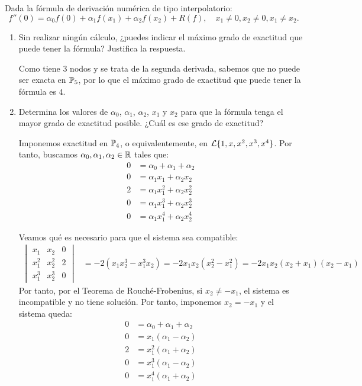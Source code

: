 \begin{ejercicio}[DGIIM 2023/2024]\label{ej:2.2.5}
    Dada la fórmula de derivación numérica de tipo interpolatorio:
    \[
    f''(0) = \alpha_0 f(0) + \alpha_1 f(x_1) + \alpha_2 f(x_2) + R(f), \quad x_1 \neq 0, x_2 \neq 0, x_1 \neq x_2.
    \]
    \begin{enumerate}
        \item Sin realizar ningún cálculo, ¿puedes indicar el máximo grado de exactitud que puede tener la fórmula? Justifica la respuesta.
        
        Como tiene $3$ nodos y se trata de la segunda derivada, sabemos que no puede ser exacta en $\mathbb{P}_5$, por lo que el máximo grado de exactitud que puede tener la fórmula es $4$.
        
        \item Determina los valores de $\alpha_0$, $\alpha_1$, $\alpha_2$, $x_1$ y $x_2$ para que la fórmula tenga el mayor grado de exactitud posible. ¿Cuál es ese grado de exactitud?
        
        Imponemos exactitud en $\mathbb{P}_4$, o equivalentemente, en $\mathcal{L}\{1, x, x^2,x^3,x^4\}$. Por tanto, buscamos $\alpha_0,\alpha_1,\alpha_2\in\mathbb{R}$ tales que:
        \begin{align*}
            0 &= \alpha_0 + \alpha_1 + \alpha_2 \\
            0 &= \alpha_1x_1 + \alpha_2x_2 \\
            2 &= \alpha_1x_1^2 + \alpha_2x_2^2 \\
            0 &= \alpha_1x_1^3 + \alpha_2x_2^3\\
            0 &= \alpha_1x_1^4 + \alpha_2x_2^4
        \end{align*}

        Veamos qué es necesario para que el sistema sea compatible:
        \begin{align*}
            \begin{vmatrix}
                x_1 & x_2 & 0 \\
                x_1^2 & x_2^2 & 2 \\
                x_1^3 & x_2^3 & 0
            \end{vmatrix} &= -2\left(x_1x_2^3-x_1^3x_2\right) = -2x_1x_2(x_2^2-x_1^2) = -2x_1x_2(x_2+x_1)(x_2-x_1)
        \end{align*}
        Por tanto, por el Teorema de Rouché-Frobenius, si $x_2\neq -x_1$, el sistema es incompatible y no tiene solución. Por tanto, imponemos $x_2=-x_1$ y el sistema queda:
        \begin{align*}
            0 &= \alpha_0 + \alpha_1 + \alpha_2 \\
            0 &= x_1(\alpha_1- \alpha_2) \\
            2 &= x_1^2(\alpha_1 + \alpha_2) \\
            0 &= x_1^3(\alpha_1 - \alpha_2)\\
            0 &= x_1^4(\alpha_1 + \alpha_2)
        \end{align*}


\end{enumerate}
\end{ejercicio}
